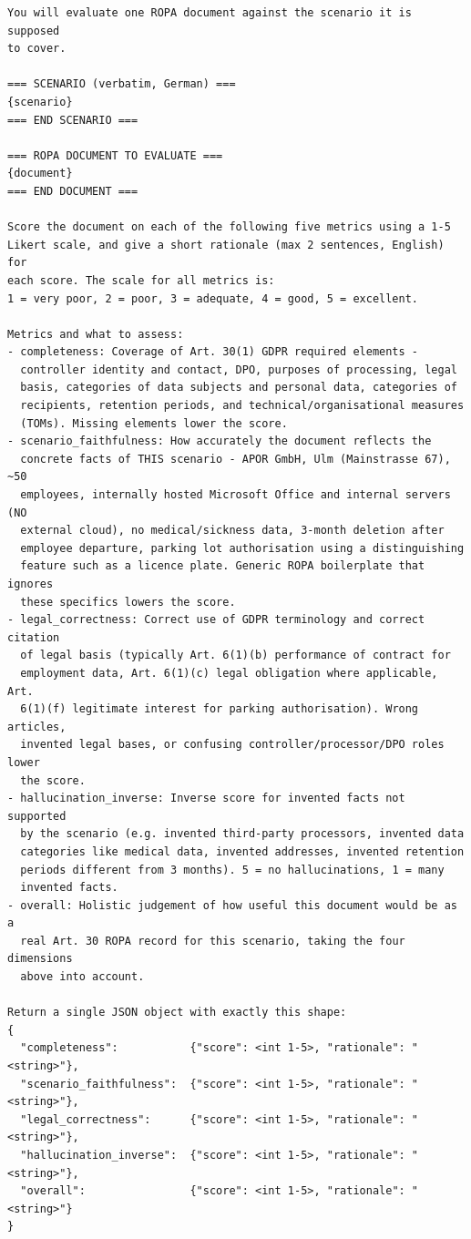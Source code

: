 \begin{lstlisting}
You will evaluate one ROPA document against the scenario it is supposed
to cover.

=== SCENARIO (verbatim, German) ===
{scenario}
=== END SCENARIO ===

=== ROPA DOCUMENT TO EVALUATE ===
{document}
=== END DOCUMENT ===

Score the document on each of the following five metrics using a 1-5
Likert scale, and give a short rationale (max 2 sentences, English) for
each score. The scale for all metrics is:
1 = very poor, 2 = poor, 3 = adequate, 4 = good, 5 = excellent.

Metrics and what to assess:
- completeness: Coverage of Art. 30(1) GDPR required elements -
  controller identity and contact, DPO, purposes of processing, legal
  basis, categories of data subjects and personal data, categories of
  recipients, retention periods, and technical/organisational measures
  (TOMs). Missing elements lower the score.
- scenario_faithfulness: How accurately the document reflects the
  concrete facts of THIS scenario - APOR GmbH, Ulm (Mainstrasse 67), ~50
  employees, internally hosted Microsoft Office and internal servers (NO
  external cloud), no medical/sickness data, 3-month deletion after
  employee departure, parking lot authorisation using a distinguishing
  feature such as a licence plate. Generic ROPA boilerplate that ignores
  these specifics lowers the score.
- legal_correctness: Correct use of GDPR terminology and correct citation
  of legal basis (typically Art. 6(1)(b) performance of contract for
  employment data, Art. 6(1)(c) legal obligation where applicable, Art.
  6(1)(f) legitimate interest for parking authorisation). Wrong articles,
  invented legal bases, or confusing controller/processor/DPO roles lower
  the score.
- hallucination_inverse: Inverse score for invented facts not supported
  by the scenario (e.g. invented third-party processors, invented data
  categories like medical data, invented addresses, invented retention
  periods different from 3 months). 5 = no hallucinations, 1 = many
  invented facts.
- overall: Holistic judgement of how useful this document would be as a
  real Art. 30 ROPA record for this scenario, taking the four dimensions
  above into account.

Return a single JSON object with exactly this shape:
{
  "completeness":           {"score": <int 1-5>, "rationale": "<string>"},
  "scenario_faithfulness":  {"score": <int 1-5>, "rationale": "<string>"},
  "legal_correctness":      {"score": <int 1-5>, "rationale": "<string>"},
  "hallucination_inverse":  {"score": <int 1-5>, "rationale": "<string>"},
  "overall":                {"score": <int 1-5>, "rationale": "<string>"}
}
\end{lstlisting}

